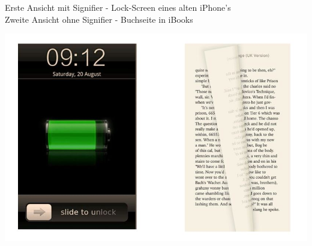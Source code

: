 Erste Ansicht mit Signifier - Lock-Screen eines alten iPhone's \\
Zweite Ansicht ohne Signifier - Buchseite in iBooks

\includegraphics[scale=.75]{images/aufg1.jpg}
